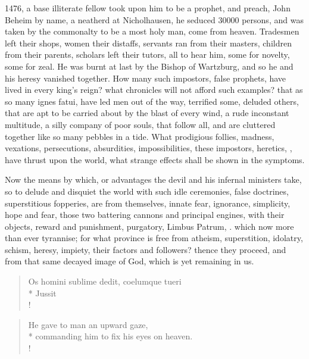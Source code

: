 {1476, a base illiterate fellow took upon him to be a prophet, and
preach, John Beheim by name, a neatherd at Nicholhausen, he seduced
30\thinspace{}000 persons, and was taken by the commonalty to be a most holy man,
come from heaven.  Tradesmen left their shops, women their
distaffs, servants ran from their masters, children from their parents,
scholars left their tutors, all to hear him, some for novelty, some for
zeal. He was burnt at last by the Bishop of Wartzburg, and so he and
his heresy vanished together. How many such impostors, false prophets,
have lived in every king's reign? what chronicles will not afford such
examples? that as so many ignes fatui, have led men out of the way,
terrified some, deluded others, that are apt to be carried about by the
blast of every wind, a rude inconstant multitude, a silly company of
poor souls, that follow all, and are cluttered together like so many
pebbles in a tide. What prodigious follies, madness, vexations,
persecutions, absurdities, impossibilities, these impostors, heretics,
\etc{}, have thrust upon the world, what strange effects shall be shown in
the symptoms.

Now the means by which, or advantages the devil and his infernal
ministers take, so to delude and disquiet the world with such idle
ceremonies, false doctrines, superstitious fopperies, are from
themselves, innate fear, ignorance, simplicity, hope and fear, those
two battering cannons and principal engines, with their objects, reward
and punishment, purgatory, Limbus Patrum, \etc{}. which now more than ever
tyrannise; for what province is free from atheism, superstition,
idolatry, schism, heresy, impiety, their factors and followers? thence
they proceed, and from that same decayed image of God, which is yet
remaining in us.

\begin{latin}
\begin{verse}%
Os homini sublime dedit, coelumque tueri\\*
Jussit\\!
\end{verse}%
\end{latin}
\translationrule%
\begin{verse}%
He gave to man an upward gaze,\\*
commanding him to fix his eyes on heaven.\\!
\end{verse}%

}
